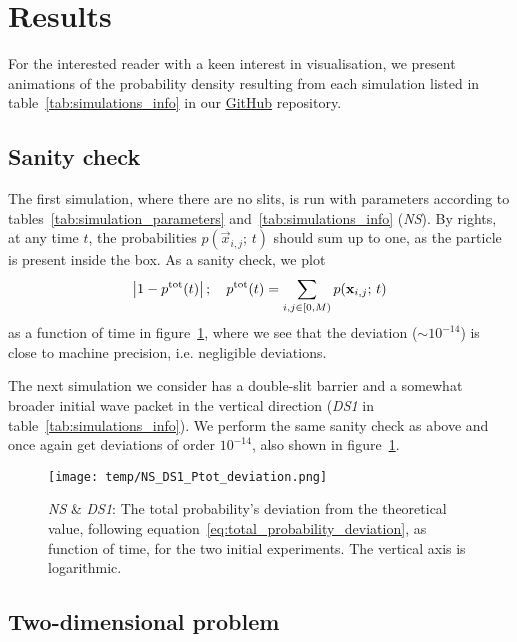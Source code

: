 \section{Results}\label{sec:results}

For the interested reader with a keen interest in visualisation, we present animations of the probability density resulting from each simulation listed in table~\ref{tab:simulations_info} in our \href{\animlink}{GitHub} repository. 



\subsection{Sanity check}\label{sec:results:sanity}

    The first simulation, where there are no slits, is run with parameters according to tables~\ref{tab:simulation_parameters} and~\ref{tab:simulations_info} (\textit{NS}). By rights, at any time $t$, the probabilities $p(\vec{x}_{i,j}; \, t)$ should sum up to one, as the particle is present inside the box. As a sanity check, we plot 
    \begin{equation}\label{eq:total_probability_deviation_old}
        \abs{1- p^\mathrm{tot}(t)}\,; \quad p^\mathrm{tot}(t) = \sum_{i,j\in [0, M)} p(\mathbf{x}_{i,j};\, t)
    \end{equation}
    as a function of time in figure~\ref{fig:ptot_deviation_NS_DS1}, where we see that the deviation ($\sim 10^{-14}$) is close to machine precision, i.e. negligible deviations.

    The next simulation we consider has a double-slit barrier and a somewhat broader initial wave packet in the vertical direction (\textit{DS1} in table~\ref{tab:simulations_info}). We perform the same sanity check as above and once again get deviations of order $ 10^{-14}$, also shown in figure~\ref{fig:ptot_deviation_NS_DS1}.

    \begin{figure}[ht!]
        \centering
        \texttt{[image: temp/NS\_DS1\_Ptot\_deviation.png]}
        \caption{\textit{NS} \& \textit{DS1}: The total probability's deviation from the theoretical value, following equation~\eqref{eq:total_probability_deviation}, as function of time, for the two initial experiments. The vertical axis is logarithmic.}
        \label{fig:ptot_deviation_NS_DS1}
    \end{figure}


\subsection{Two-dimensional problem}
    
